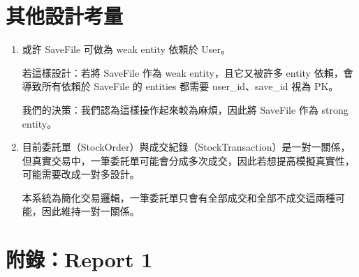 \documentclass[UTF8, a4paper, 12pt, fontset=none]{ctexart}
\begin{document}
\section{其他設計考量}
\begin{enumerate}
    \item 或許 SaveFile 可做為 weak entity 依賴於 User。
    
    若這樣設計：若將 SaveFile 作為 weak entity，且它又被許多 entity 依賴，會導致所有依賴於 SaveFile 的 entities 都需要 user\_id、save\_id 視為 PK。

    我們的決策：我們認為這樣操作起來較為麻煩，因此將 SaveFile 作為 strong entity。

    \item 目前委託單（StockOrder）與成交紀錄（StockTransaction）是一對一關係，但真實交易中，一筆委託單可能會分成多次成交，因此若想提高模擬真實性，可能需要改成一對多設計。
    
    本系統為簡化交易邏輯，一筆委託單只會有全部成交和全部不成交這兩種可能，因此維持一對一關係。

\end{enumerate}

\appendix
\section{附錄：Report 1}

\end{document}
